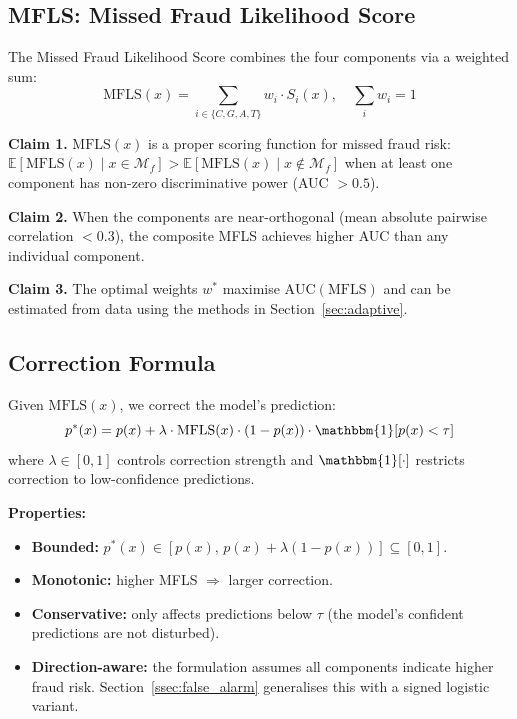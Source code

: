 \documentclass[journal]{IEEEtran}
\newcommand{\MFLS}{\mathrm{MFLS}}
\newcommand{\ind}{\mathbbm{1}}
\begin{document}
\subsection{MFLS: Missed Fraud Likelihood Score}
\label{ssec:mfls}

\begin{definition}[MFLS]
The Missed Fraud Likelihood Score combines the four components via a weighted sum:
\begin{equation}
  \MFLS(x) = \sum_{i \in \{C,G,A,T\}} w_i \cdot S_i(x), \quad \sum_i w_i = 1
  \label{eq:mfls}
\end{equation}
\end{definition}

\textbf{Claim 1.} $\MFLS(x)$ is a proper scoring function for missed fraud risk: $\mathbb{E}[\MFLS(x) \mid x \in \mathcal{M}_f] > \mathbb{E}[\MFLS(x) \mid x \notin \mathcal{M}_f]$ when at least one component has non-zero discriminative power (AUC $> 0.5$).

\textbf{Claim 2.} When the components are near-orthogonal (mean absolute pairwise correlation $< 0.3$), the composite MFLS achieves higher AUC than any individual component.

\textbf{Claim 3.} The optimal weights $w^*$ maximise $\text{AUC}(\MFLS)$ and can be estimated from data using the methods in Section~\ref{sec:adaptive}.

\subsection{Correction Formula}
\label{ssec:correction}

Given $\MFLS(x)$, we correct the model's prediction:
\begin{equation}
  p^*(x) = p(x) + \lambda \cdot \MFLS(x) \cdot (1 - p(x)) \cdot \ind[p(x) < \tau]
  \label{eq:correction}
\end{equation}
where $\lambda \in [0,1]$ controls correction strength and $\ind[\cdot]$ restricts correction to low-confidence predictions.

\textbf{Properties:}
\begin{itemize}
  \item \textbf{Bounded:} $p^*(x) \in [p(x),\, p(x) + \lambda(1-p(x))] \subseteq [0,1]$.
  \item \textbf{Monotonic:} higher MFLS $\Rightarrow$ larger correction.
  \item \textbf{Conservative:} only affects predictions below $\tau$ (the model's confident predictions are not disturbed).
  \item \textbf{Direction-aware:} the formulation assumes all components indicate higher fraud risk. Section~\ref{ssec:false_alarm} generalises this with a signed logistic variant.
\end{itemize}
\end{document}
